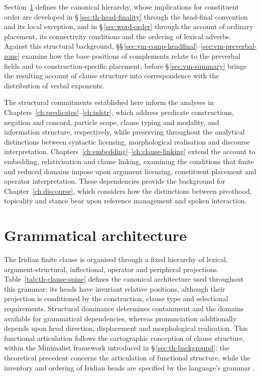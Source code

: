 Section~\ref{sec:grammatical-architecture} defines the canonical hierarchy,
whose implications for constituent order are developed in
§\,\ref{sec:th-head-finality} through the head-final convention and its local
exception, and in §\,\ref{sec:word-order} through the account of ordinary
placement, its connectivity conditions and the ordering of lexical adverbs.
Against this structural background,
§§\,\ref{sec:vm-comp-headfinal}--\ref{sec:vm-preverbal-zone} examine how the
base positions of complements relate to the preverbal fields and to
construction-specific placement, before §\,\ref{sec:vm-summary} brings the
resulting account of clause structure into correspondence with the
distribution of verbal exponents.

The structural commitments established here inform the analyses in
Chapters~\ref{ch:predicates}--\ref{ch:infstr}, which address predicate
constructions, negation and concord, particle scope, clause typing and
modality, and information structure, respectively, while preserving
throughout the analytical distinctions between syntactic licensing,
morphological realisation and discourse interpretation.
Chapters~\ref{ch:embedding}--\ref{ch:clause-linking} extend the account to
embedding, relativisation and clause linking, examining the conditions that
finite and reduced domains impose upon argument licensing, constituent
placement and operator interpretation. These dependencies provide the
background for Chapter~\ref{ch:discourse}, which considers how the
distinctions between pivothood, topicality and stance bear upon reference
management and spoken interaction.


\section{Grammatical architecture}\label{sec:grammatical-architecture}
\label{sec:th-clause-structure}%

The Iridian finite clause is organised through a fixed hierarchy of lexical,
argument-structural, inflectional, operator and peripheral projections.
Table~\ref{tab:th-clause-spine} defines the canonical architecture used
throughout this grammar: its heads have invariant relative positions,
although their projection is conditioned by the construction, clause type and
selectional requirements. Structural dominance determines containment and the
domains available for grammatical dependencies, whereas pronunciation
additionally depends upon head direction, displacement and morphological
realisation. This functional articulation follows the cartographic conception
of clause structure, within the Minimalist framework introduced in
§\,\ref{sec:th-background}; the theoretical precedent concerns the
articulation of functional structure, while the inventory and ordering of
Iridian heads are specified by the language's grammar
\cite{rizzi1997,cinquerizzi2010}.

